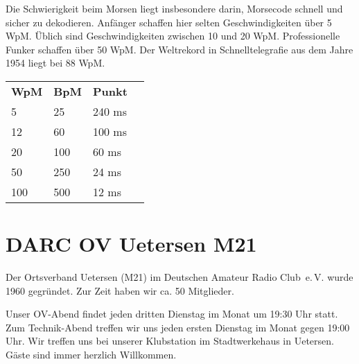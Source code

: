 \documentclass{scrartcl}
\begin{document}
    Die Schwierigkeit beim Morsen liegt insbesondere darin,
    Morsecode schnell und sicher zu dekodieren.
    Anfänger schaffen hier selten Geschwindigkeiten über 5 WpM.
    Üblich sind Geschwindigkeiten zwischen 10 und 20 WpM. Professionelle
    Funker schaffen über 50 WpM. Der Weltrekord in Schnelltelegrafie
    aus dem Jahre 1954 liegt bei 88 WpM.
    
    \begin{tabular}{@{}llll}
      \bfseries WpM & \bfseries BpM & \bfseries Punkt \\
      5 & 25 & 240 ms \\
      12 & 60 & 100 ms \\
      20 & 100 & 60 ms \\
      50 & 250 & 24 ms \\
      100 & 500 & 12 ms
    \end{tabular}
    
    \section{DARC OV Uetersen M21}
    
    Der Ortsverband Uetersen (M21) im Deutschen Amateur Radio Club~e.\,V.
    wurde 1960 gegründet. Zur Zeit haben wir ca. 50 Mitglieder.

    Unser OV-Abend findet jeden dritten Dienstag im Monat um 19:30 Uhr
    statt. Zum Technik-Abend treffen wir uns jeden ersten Dienstag im Monat
    gegen 19:00 Uhr. Wir treffen uns bei unserer Klubstation im Stadtwerkehaus
    in Uetersen. Gäste sind immer herzlich Willkommen.
    
\end{document}
